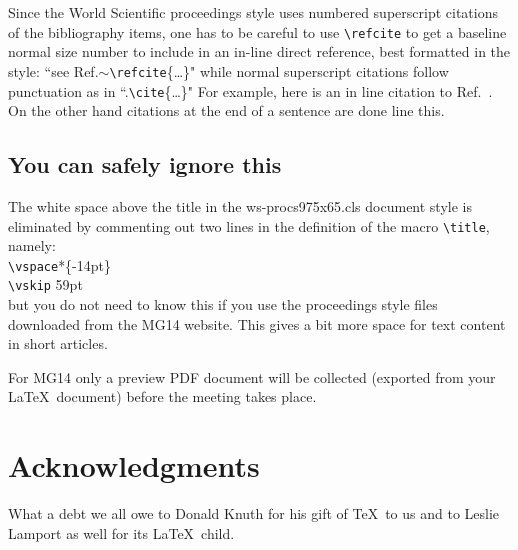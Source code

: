 \documentclass{ws-procs975x65}
\begin{document}
Since the World Scientific proceedings style \cite{ws} uses numbered superscript citations of the bibliography items, one has to be careful to use 
\verb|\refcite| to get a baseline normal size number to include in an in-line direct reference, best formatted in the style: 
 ``see Ref.$\sim$\verb|\refcite|\{\ldots\}" while normal superscript citations follow punctuation  as in ``.\verb|\cite|\{\ldots\}"  For example, here is an in line citation to Ref.~. On the other hand citations at the end of a sentence are done line this.\cite{lamp94}

\subsection{You can safely ignore this}

The white space above the title in the ws-procs975x65.cls document style is eliminated by commenting out two lines in the definition of the macro \verb|\title|, namely:\\  
 \verb|\vspace|*\{-14pt\} \\ \verb|\vskip| 59pt\\
but you do not need to know this if you use the proceedings style files downloaded from the MG14 website. This gives a bit more space for text content in short articles.

For MG14 \cite{mg14} only a preview PDF document will be collected (exported from your \LaTeX\ document) before the meeting takes place.

\section*{Acknowledgments}

What a debt we all owe to Donald Knuth for his gift of \TeX\ to us and to Leslie Lamport as well for its \LaTeX\ child.




\end{document}
